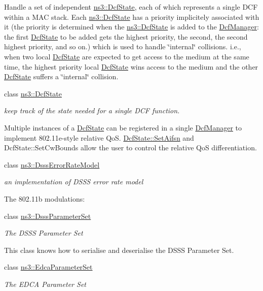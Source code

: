 \begin{DoxyCompactItemize}
\begin{DoxyCompactList}
Handle a set of independent \hyperlink{classns3_1_1DcfState}{ns3\+::\+Dcf\+State}, each of which represents a single D\+CF within a M\+AC stack. Each \hyperlink{classns3_1_1DcfState}{ns3\+::\+Dcf\+State} has a priority implicitely associated with it (the priority is determined when the \hyperlink{classns3_1_1DcfState}{ns3\+::\+Dcf\+State} is added to the \hyperlink{classns3_1_1DcfManager}{Dcf\+Manager}\+: the first \hyperlink{classns3_1_1DcfState}{Dcf\+State} to be added gets the highest priority, the second, the second highest priority, and so on.) which is used to handle \char`\"{}internal\char`\"{} collisions. i.\+e., when two local \hyperlink{classns3_1_1DcfState}{Dcf\+State} are expected to get access to the medium at the same time, the highest priority local \hyperlink{classns3_1_1DcfState}{Dcf\+State} wins access to the medium and the other \hyperlink{classns3_1_1DcfState}{Dcf\+State} suffers a \char`\"{}internal\char`\"{} collision. \end{DoxyCompactList}\item 
class \hyperlink{classns3_1_1DcfState}{ns3\+::\+Dcf\+State}
\begin{DoxyCompactList}\small\item\em keep track of the state needed for a single D\+CF function.

Multiple instances of a \hyperlink{classns3_1_1DcfState}{Dcf\+State} can be registered in a single \hyperlink{classns3_1_1DcfManager}{Dcf\+Manager} to implement 802.\+11e-\/style relative QoS. \hyperlink{classns3_1_1DcfState_ae957a4ab4e518d5efd50bb8640dd07c5}{Dcf\+State\+::\+Set\+Aifsn} and Dcf\+State\+::\+Set\+Cw\+Bounds allow the user to control the relative QoS differentiation. \end{DoxyCompactList}\item 
class \hyperlink{classns3_1_1DsssErrorRateModel}{ns3\+::\+Dsss\+Error\+Rate\+Model}
\begin{DoxyCompactList}\small\item\em an implementation of D\+S\+SS error rate model

The 802.\+11b modulations\+: \end{DoxyCompactList}\item 
class \hyperlink{classns3_1_1DsssParameterSet}{ns3\+::\+Dsss\+Parameter\+Set}
\begin{DoxyCompactList}\small\item\em The D\+S\+SS Parameter Set

This class knows how to serialise and deserialise the D\+S\+SS Parameter Set. \end{DoxyCompactList}\item 
class \hyperlink{classns3_1_1EdcaParameterSet}{ns3\+::\+Edca\+Parameter\+Set}
\begin{DoxyCompactList}\small\item\em The E\+D\+CA Parameter Set


\end{DoxyCompactList}
\end{DoxyCompactItemize}
